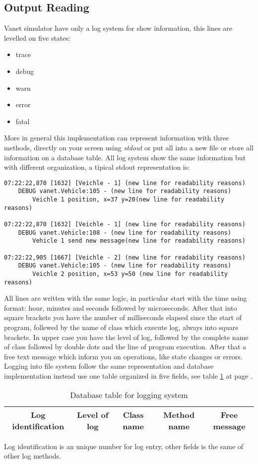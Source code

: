 \subsection{Output Reading}
Vanet simulator have only a log system for show information, this lines are levelled on five states:
\begin{itemize}
	\item trace
	\item debug
	\item warn
	\item error
	\item fatal
\end{itemize}
More in general this implementation can represent information with three methods, directly on your screen using \textit{stdout} or put all into a new file or store all information on a database table. All log system show the same information but with different organization, a tipical stdout representation is:
\begin{verbatim}
07:22:22,870 [1632] [Veichle - 1] (new line for readability reasons)
	DEBUG vanet.Vehicle:105 - (new line for readability reasons)
		Veichle 1 position, x=37 y=20(new line for readability reasons)
		
07:22:22,870 [1632] [Veichle - 1] (new line for readability reasons)
	DEBUG vanet.Vehicle:108 - (new line for readability reasons)
		Vehicle 1 send new message(new line for readability reasons)
		
07:22:22,905 [1667] [Veichle - 2] (new line for readability reasons)
	DEBUG vanet.Vehicle:105 - (new line for readability reasons)
		Veichle 2 position, x=53 y=50 (new line for readability reasons)
\end{verbatim}
All lines are written with the same logic, in particular start with the time using format: hour, minutes and seconds followed by microseconds. After that into square brackets you have the number of milliseconds elapsed since the start of program, follewed by the name of class which execute log, always into square brackets. In upper case you have the level of log, followed by the complete name of class followed by double dots and the line of program execution. After that a free text message which inform you on operations, like state changes or errors.\\
Logging into file system follow the same representation and database implementation instead use one table organized in five fields, see table \ref{tab:DBLog} at page \pageref{tab:DBLog}.
\begin{table}[!ht]
	\centering
	\caption{Database table for logging system}
	\begin{tabular}{|c|c|c|c|c|}
	\hline\hline 
	\textbf{Log identification} & \textbf{Level of log} & \textbf{Class name} & \textbf{Method name} & \textbf{Free message}\\
	\hline
	\hline     %
 	\end{tabular} 
	\label{tab:DBLog}
\end{table}
Log identification is an unique number for log entry, other fields is the same of other log methods.
